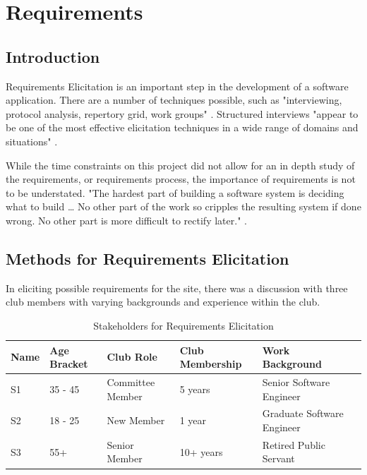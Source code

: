 \chapter{Requirements}
\label{requirements}

\section{Introduction}

Requirements Elicitation is an important step in the development of a software application. There are a number of techniques possible, such as "interviewing, protocol analysis, repertory grid, work groups" \parencite{davis2006effectiveness}. Structured interviews "appear to be one of the most effective elicitation techniques in a wide range of domains and situations" \parencite{davis2006effectiveness}. 

While the time constraints on this project did not allow for an in depth study of the requirements, or requirements process, the importance of requirements is not to be understated. "The hardest part of building a software system is deciding what to build … No other part of the work so cripples the resulting system if done wrong. No other part is more difficult to rectify later." \parencite{brooks}.

\section{Methods for Requirements Elicitation}

In eliciting possible requirements for the site, there was a discussion with three club members with varying backgrounds and experience within the club.

\begin{table}[H]
\caption{Stakeholders for Requirements Elicitation}
\begin{center}
    \begin{tabular}{ | l | l | l | l | l| p{5cm} |}
    \hline
    Name & Age Bracket & Club Role & Club Membership & Work Background \\ \hline
	S1 & 35 - 45& Committee Member & 5 years & Senior Software Engineer \\ \hline
	S2 & 18 - 25 & New Member & 1 year & Graduate Software Engineer \\ \hline
	S3 & 55+ & Senior Member & 10+ years & Retired Public Servant \\ \hline
    \end{tabular}
\end{center}
\label{fig:userelicit}
\end{table}

